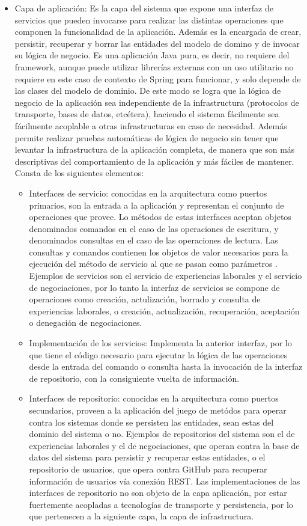 \documentclass[a4paper, 12pt]{book}
\begin{document}
\begin{itemize}
  \item Capa de aplicación: Es la capa del sistema que expone una interfaz de servicios que pueden invocarse para realizar las distintas operaciones que componen la funcionalidad de la aplicación. Además es la encargada de crear, persistir, recuperar y borrar las entidades del modelo de domino y de invocar su lógica de negocio.
Es una aplicación Java pura, es decir, no requiere del framework, aunque puede utilizar librerías externas con un uso utilitario no requiere en este caso de contexto de Spring para funcionar, y solo depende de las clases del modelo de dominio. 
De este modo se logra que la lógica de negocio de la aplicación sea independiente de la infrastructura (protocolos de transporte, bases de datos, etcétera), haciendo el sistema fácilmente sea fácilmente acoplable a otras infrastructuras en caso de necesidad. 
Además permite realizar pruebas automáticas de lógica de negocio sin tener que levantar la infrastructura de la aplicación completa, de manera que son más descriptivas del comportamiento de la aplicación y más fáciles de mantener.
Consta de los siguientes elementos:

	\begin{itemize}
	\item Interfaces de servicio: conocidas en la arquitectura como puertos primarios, son la entrada a la aplicación y representan el conjunto de operaciones que provee. Lo métodos de estas interfaces aceptan objetos denominados comandos en el caso de las operaciones de escritura, y denominados consultas en el caso de las operaciones de lectura.
	Las consultas y comandos contienen los objetos de valor necesarios para la ejecución del método de servicio al que se pasan como parámetros
	. Ejemplos de servicios son el servicio de experiencias laborales y el servicio de negociaciones, por lo tanto la interfaz de servicios se compone de operaciones como creación, actulización, borrado y consulta de experiencias laborales,
	o creación, actualización, recuperación, aceptación o denegación de negociaciones.
	\item Implementación de los servicios: Implementa la anterior interfaz, por lo que tiene el código necesario para ejecutar la lógica de las operaciones desde la entrada del comando o consulta hasta la invocación de la interfaz de repositorio, con la consiguiente vuelta de información.
	\item Interfaces de repositorio: conocidas en la arquitectura como puertos secundarios, proveen a la aplicación del juego de metódos para operar contra los sistemas donde se persisten las entidades, sean estas del dominio del sistema o no. 
	Ejemplos de repositorios del sistema son el de experiencias laborales y el de negociaciones, que operan contra la base de datos del sistema para persistir y recuperar estas entidades, o el repositorio de usuarios, que opera contra GitHub para recuperar información de usuarios vía conexión REST.
	Las implementaciones de las interfaces de repositorio no son objeto de la capa aplicación, por estar fuertemente acopladas a tecnologías de transporte y persistencia, por lo que pertenecen a la siguiente capa, la capa de infrastructura.
	\end{itemize}



\end{itemize}
\end{document}
